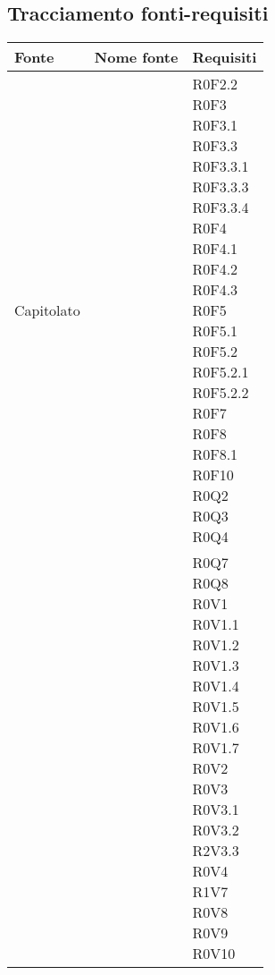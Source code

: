 \documentclass[AnalisiDeiRequisiti.tex]{subfiles}
\begin{document}
\subsection{Tracciamento fonti-requisiti}

\label{table:Tabella di tracciamento fonti-requisiti}


\renewcommand*{\arraystretch}{1.2}
\begin{longtable}[H]{p{2cm}p{5cm}p{5cm}}
	\rowcolor{CHeader} 
	\color{CHeaderText} \textbf{Fonte} & \color{CHeaderText} \textbf{Nome fonte} & \color{CHeaderText} \textbf{Requisiti} \\  
	\endhead
	Capitolato & & \makecell[tl]{ R0F2.2 \\
	 R0F3 \\
	 R0F3.1 \\
	 R0F3.3 \\
	 R0F3.3.1 \\
	 R0F3.3.3 \\
	 R0F3.3.4 \\
	 R0F4 \\
	 R0F4.1 \\
	 R0F4.2 \\
	 R0F4.3 \\
	 R0F5 \\
	 R0F5.1 \\
	 R0F5.2 \\
	 R0F5.2.1 \\
	 R0F5.2.2 \\
	 R0F7 \\
	 R0F8 \\
	 R0F8.1 \\
	 R0F10 \\
	 R0Q2 \\
	 R0Q3 \\
	 R0Q4 
 	} \\
 	\rowcolor{CRigheDispari}
 	& & \makecell[tl]{
	 R0Q7 \\
	 R0Q8 \\
	 R0V1 \\
	 R0V1.1 \\
	 R0V1.2 \\
	 R0V1.3 \\
	 R0V1.4 \\
	 R0V1.5 \\
	 R0V1.6 \\
	 R0V1.7 \\
	 R0V2 \\
	 R0V3 \\
	 R0V3.1 \\
	 R0V3.2 \\
	 R2V3.3 \\
	 R0V4 \\
	 R1V7 \\
	 R0V8 \\
	 R0V9 \\
	 R0V10 } \\
	

\end{longtable}
\end{document}
